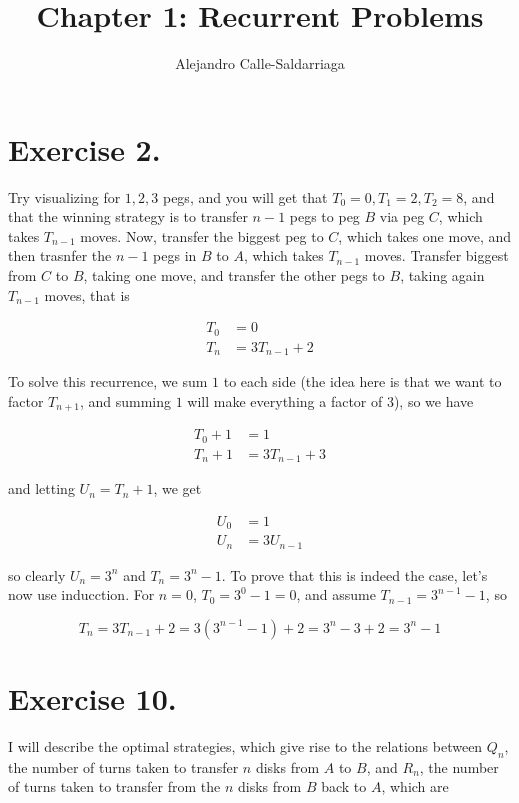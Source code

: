 \documentclass[a4paper]{article}
\begin{document}
\title{Chapter 1: Recurrent Problems}
\author{Alejandro Calle-Saldarriaga\\
	}

\section*{Exercise 2.}

Try visualizing for $1, 2, 3$ pegs, and you will get that 
$T_0 = 0, T_1 = 2, T_2 = 8$, and that the winning strategy 
is to transfer $n-1$ pegs to peg $B$ via peg $C$, which takes 
$T_{n-1}$ moves. Now, transfer the biggest peg to $C$, which takes
one move, and then trasnfer the $n-1$ pegs in $B$ to $A$, which takes 
$T_{n-1}$ moves. Transfer biggest from $C$ to $B$, taking one move, and 
transfer the other pegs to $B$, taking again $T_{n-1}$ moves, that is

\begin{align*}
    T_0 & = 0 \\
    T_{n} & = 3T_{n-1} + 2
\end{align*}

To solve this recurrence, we sum $1$ to each side (the idea here 
is that we want to factor $T_{n+1}$, and summing $1$ will make everything a 
factor of $3$), so we have 

\begin{align*}
    T_0 + 1 & = 1 \\
    T_{n} + 1 & = 3T_{n-1} + 3
\end{align*}

and letting $U_n = T_{n} + 1$, we get 

\begin{align*}
    U_0 & = 1 \\
    U_n & = 3U_{n-1}
\end{align*}

so clearly $U_n = 3^n$ and $T_n = 3^n - 1$. To prove that this is indeed the 
case, let's now use inducction. For $n=0$, $T_0 = 3^0 - 1 = 0$, and assume 
$T_{n-1} = 3^{n-1} - 1$, so 

\begin{equation*}
    T_n = 3T_{n-1} + 2 = 3(3^{n-1}-1) + 2 = 3^n - 3 + 2 = 3^n - 1
\end{equation*}

\section*{Exercise 10.}

I will describe the optimal strategies, which give rise to the relations between
$Q_n$, the number of turns taken to transfer $n$ disks from $A$ to $B$, and 
$R_n$, the number of turns taken to transfer from the $n$ disks from $B$ back 
to $A$, which are 
\end{document}
